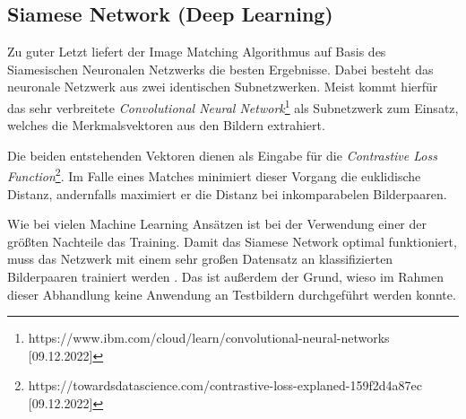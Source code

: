 \subsection{Siamese Network (Deep Learning)}
Zu guter Letzt liefert der Image Matching Algorithmus auf Basis des Siamesischen
Neuronalen Netzwerks die besten Ergebnisse. Dabei besteht das neuronale Netzwerk
aus zwei identischen Subnetzwerken. Meist kommt hierfür das sehr verbreitete
\textit{Convolutional Neural Network}\footnote{https://www.ibm.com/cloud/learn/convolutional-neural-networks [09.12.2022]}
als Subnetzwerk zum Einsatz, welches die Merkmalsvektoren aus den Bildern
extrahiert. \parencite{siamese-orig-paper}

Die beiden entstehenden Vektoren dienen als Eingabe für die
\textit{Contrastive Loss Function}\footnote{https://towardsdatascience.com/contrastive-loss-explaned-159f2d4a87ec [09.12.2022]}.
Im Falle eines Matches minimiert dieser Vorgang die euklidische Distanz,
andernfalls maximiert er die Distanz bei inkomparabelen Bilderpaaren.
\parencite{siamese-orig-paper}

Wie bei vielen Machine Learning Ansätzen ist bei der Verwendung einer der
größten Nachteile das Training. Damit das Siamese Network optimal funktioniert,
muss das Netzwerk mit einem sehr großen Datensatz an klassifizierten
Bilderpaaren trainiert werden \parencite{mse-naive-approach}. Das ist außerdem
der Grund, wieso im Rahmen dieser Abhandlung keine Anwendung an Testbildern 
durchgeführt werden konnte.
